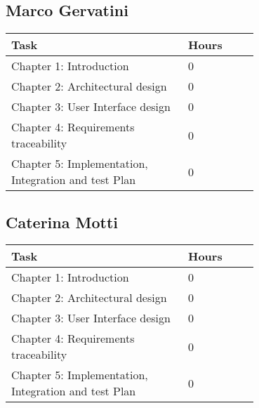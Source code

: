 \subsection{Marco Gervatini}
\begin{center}
	\begin{tabular}{@{}p{0.5\linewidth} p{0.2\linewidth}@{}}
		\hline
		\textbf{Task} & \textbf{Hours} \\ \hline
             Chapter 1: Introduction & 0 \\ \hline
             Chapter 2: Architectural design & 0 \\ \hline
             Chapter 3: User Interface design & 0 \\ \hline
             Chapter 4: Requirements traceability & 0 \\ \hline
             Chapter 5: Implementation, Integration
    and test Plan & 0 \\ \hline
	\end{tabular}
\end{center}

\subsection{Caterina Motti}
\begin{center}
	\begin{tabular}{@{}p{0.5\linewidth} p{0.2\linewidth}@{}}
		\hline
		\textbf{Task} & \textbf{Hours} \\ \hline
            Chapter 1: Introduction & 0 \\ \hline
            Chapter 2: Architectural design & 0 \\ \hline
            Chapter 3: User Interface design & 0 \\ \hline
            Chapter 4: Requirements traceability & 0 \\ \hline
            Chapter 5: Implementation, Integration
    and test Plan & 0 \\ \hline
	\end{tabular}
\end{center}
